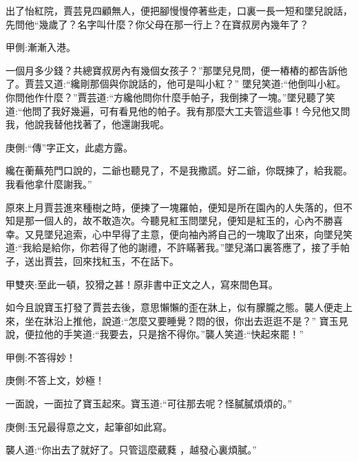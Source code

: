 \begin{parag}
    出了怡紅院，賈芸見四顧無人，便把腳慢慢停著些走，口裏一長一短和墜兒說話，先問他“幾歲了？名字叫什麼？你父母在那一行上？在寶叔房內幾年了？\begin{note}甲側:漸漸入港。\end{note}一個月多少錢？共總寶叔房內有幾個女孩子？”那墜兒見問，便一樁樁的都告訴他了。賈芸又道:“纔剛那個與你說話的，他可是叫小紅？” 墜兒笑道:“他倒叫小紅。你問他作什麼？”賈芸道:“方纔他問你什麼手帕子，我倒揀了一塊。”墜兒聽了笑道:“他問了我好幾遍，可有看見他的帕子。我有那麼大工夫管這些事！今兒他又問我，他說我替他找著了，他還謝我呢。\begin{note}庚側:“傳”字正文，此處方露。\end{note}纔在蘅蕪苑門口說的，二爺也聽見了，不是我撒謊。好二爺，你既揀了，給我罷。我看他拿什麼謝我。”
\end{parag}


\begin{parag}
    原來上月賈芸進來種樹之時，便揀了一塊羅帕，便知是所在園內的人失落的，但不知是那一個人的，故不敢造次。今聽見紅玉問墜兒，便知是紅玉的，心內不勝喜幸。又見墜兒追索，心中早得了主意，便向袖內將自己的一塊取了出來，向墜兒笑道:“我給是給你，你若得了他的謝禮，不許瞞著我。”墜兒滿口裏答應了，接了手帕子，送出賈芸，回來找紅玉，不在話下。\begin{note}甲雙夾:至此一頓，狡猾之甚！原非書中正文之人，寫來間色耳。\end{note}
\end{parag}


\begin{parag}
    如今且說寶玉打發了賈芸去後，意思懶懶的歪在牀上，似有朦朧之態。襲人便走上來，坐在牀沿上推他，說道:“怎麼又要睡覺？悶的很，你出去逛逛不是？” 寶玉見說，便拉他的手笑道:“我要去，只是捨不得你。”襲人笑道:“快起來罷！”\begin{note}甲側:不答得妙！\end{note}\begin{note}庚側:不答上文，妙極！\end{note}一面說，一面拉了寶玉起來。寶玉道:“可往那去呢？怪膩膩煩煩的。”\begin{note}庚側:玉兄最得意之文，起筆卻如此寫。\end{note}襲人道:“你出去了就好了。只管這麼葳蕤 ，越發心裏煩膩。”
\end{parag}



